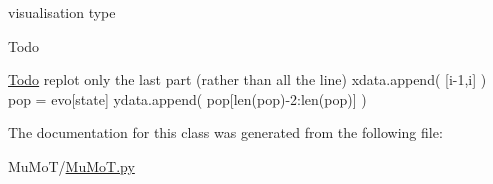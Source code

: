 visualisation type 

\begin{DoxyRefDesc}{Todo}
\item[\hyperlink{todo__todo000069}{Todo}]replot only the last part (rather than all the line) xdata.\+append( \mbox{[}i-\/1,i\mbox{]} ) pop = evo\mbox{[}state\mbox{]} ydata.\+append( pop\mbox{[}len(pop)-\/2\+:len(pop)\mbox{]} ) \end{DoxyRefDesc}


The documentation for this class was generated from the following file\+:\begin{DoxyCompactItemize}
\item 
Mu\+Mo\+T/\hyperlink{_mu_mo_t_8py}{Mu\+Mo\+T.\+py}\end{DoxyCompactItemize}
